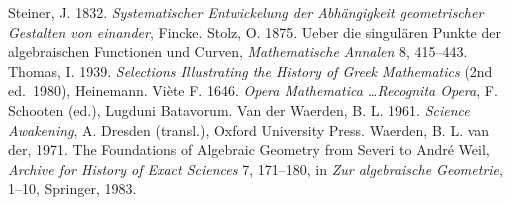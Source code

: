 \newline\indent   Steiner, J. 1832. \emph{Systematischer Entwickelung der Abh\"angigkeit geometri\-scher Gestalten von einander}, Fincke.
 \newline\indent Stolz, O.  1875. Ueber die singul\"aren Punkte der algebraischen Functionen und Curven, \emph{Mathematische Annalen} 8, 415--443. 
\newline\indent Thomas, I. 1939. \emph{Selections Illustrating the History of Greek Mathematics} (2nd ed.\ 1980), Heinemann.
 \newline\indent Vi\`ete  F. 1646.  \emph{Opera Mathematica \ldots Recognita Opera}, F.  Schooten (ed.), Lugduni Batavorum.
\newline\indent Van der Waerden, B. L. 1961. \emph{Science Awakening}, A. Dresden (transl.), Oxford University Press.
\newline\indent Waerden, B. L. van der, 1971.  The Foundations of Algebraic Geometry from Severi to Andr{\'e} Weil, \emph{Archive for History of Exact Sciences} 7,  171--180, in  \emph{Zur algebraische Geometrie},  1--10, Springer, 1983.
 \normalsize
 

\endgroup
 

%
